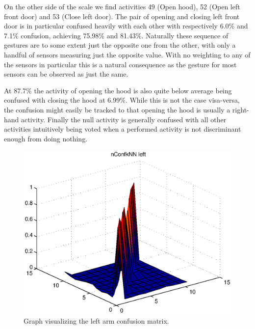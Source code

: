 \documentclass{sig-alternate}
\begin{document}
On the other side of the scale we find activities 49 (Open hood), 52 (Open left front door) and 53 (Close left door). The pair of opening and closing left front door is in particular confused heavily with each other with respectively 6.0\% and 7.1\% confusion, achieving 75.98\% and 81.43\%. Naturally these sequence of gestures are to some extent just the opposite one from the other, with only a handful of sensors measuring just the opposite value. With no weighting to any of the sensors in particular this is a natural consequence as the gesture for most sensors can be observed as just the same.

At 87.7\% the activity of opening the hood is also quite below average being confused with closing the hood at 6.99\%. While this is not the case visa-versa, the confusion might easily be tracked to that opening the hood is usually a right-hand activity. Finally the null activity is generally confused with all other activities intuitively being voted when a performed activity is not discriminant enough from doing nothing.

\begin{figure}[t]
  \centering
  \includegraphics[scale=0.4]{./matlab_output/nConfkNN_left.eps}
  \caption{Graph visualizing the left arm confusion matrix.}
  \label{fig:conf_left_surf}
\end{figure}
\end{document}
